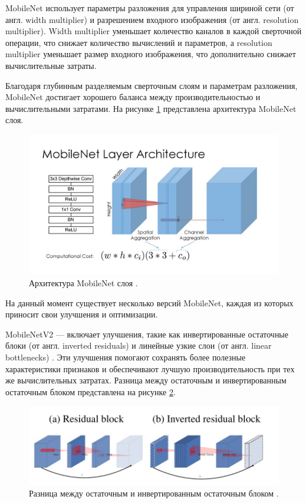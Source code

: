 \documentclass[a4paper,12pt]{extarticle}
\begin{document}
MobileNet использует параметры разложения для управления шириной сети (от англ. width multiplier) и разрешением входного изображения (от англ. resolution multiplier). Width multiplier уменьшает количество каналов в каждой сверточной операции, что снижает количество вычислений и параметров, а resolution multiplier уменьшает размер входного изображения, что дополнительно снижает вычислительные затраты.
 
Благодаря глубинным разделяемым сверточным слоям и параметрам разложения, MobileNet достигает хорошего баланса между производительностью и вычислительными затратами. На рисунке \ref{fig:mobilenet} представлена архитектура MobileNet слоя.


\begin{figure}[ht]
	\centering
	\includegraphics[scale=0.8]{mobilenet.png}
	\caption{Архитектура MobileNet слоя \cite{mobilenet}.}
	\label{fig:mobilenet}
\end{figure}

На данный момент существует несколько версий MobileNet, каждая из которых приносит свои улучшения и оптимизации.

MobileNetV2 — включает улучшения, такие как инвертированные остаточные блоки (от англ. inverted residuals) и линейные узкие слои (от англ. linear bottlenecks) \cite{mobilenetv2}. Эти улучшения помогают сохранять более полезные характеристики признаков и обеспечивают лучшую производительность при тех же вычислительных затратах. Разница между остаточным и инвертированным остаточным блоком представлена на рисунке \ref{fig:mobilenetv2}.

\begin{figure}[ht]
	\centering
	\includegraphics[scale=0.4]{mobilenetv2.png}
	\caption{Разница между остаточным и инвертированным остаточным блоком \cite{mobilenetv2}.}
	\label{fig:mobilenetv2}
\end{figure}
\end{document}
